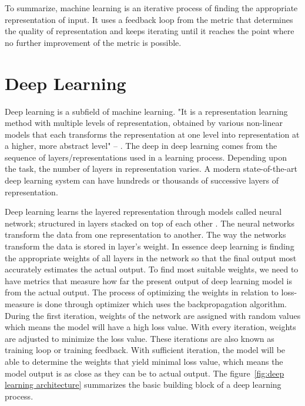 To summarize, machine learning is an iterative process of finding the appropriate representation of input. It uses a feedback loop from the metric that determines the quality of representation and keeps iterating until it reaches the point where no further improvement of the metric is possible. 

\section{Deep Learning}
Deep learning is a subfield of machine learning. "It is a representation learning method with multiple levels of representation, obtained by various non-linear models that each transforms the representation at one level into representation at a higher, more abstract level" -- \citet{lecun2015deep}. The deep in deep learning comes from the sequence of layers/representations used in a learning process. Depending upon the task, the number of layers in representation varies. A modern state-of-the-art deep learning system can have hundreds or thousands of successive layers of representation. 

Deep learning learns the layered representation through models called neural network; structured in layers stacked on top of each other \citep{chollet2017deep}. The neural networks transform the data from one representation to another. The way the networks transform the data is stored in layer's weight. In essence deep learning is finding the appropriate weights of all layers in the network so that the final output most accurately estimates the actual output. To find most suitable weights, we need to have metrics that measure how far the present output of deep learning model is from the actual output. The process of optimizing the weights in relation to loss-measure is done through optimizer which uses the backpropagation algorithm. During the first iteration, weights of the network are assigned with random values which means the model will have a high loss value. With every iteration, weights are adjusted to minimize the loss value. These iterations are also known as training loop or training feedback. With sufficient iteration, the model will be able to determine the weights that yield minimal loss value, which means the model output is as close as they can be to actual output. The figure~\ref{fig:deep learning architecture} summarizes the basic building block of a deep learning process.  

